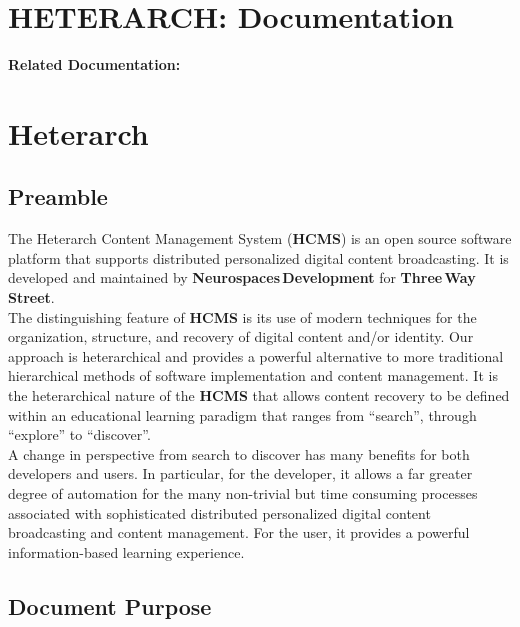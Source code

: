 \documentclass[12pt]{article}
\begin{document}
\section*{HETERARCH: Documentation}

{\bf Related Documentation:}

\section*{Heterarch}

\subsection*{Preamble}

The Heterarch Content Management System ({\bf \small HCMS}) is an open source software platform that supports distributed personalized digital content broadcasting. It is developed and maintained by {\bf Neurospaces\,Development} for {\bf Three\,Way\,Street}.\\
The distinguishing feature of {\bf \small HCMS} is its use of modern techniques for the organization, structure, and recovery of digital content and/or identity. Our approach is heterarchical and provides a powerful alternative to more traditional hierarchical methods of software implementation and content management. It is the heterarchical nature of the {\bf \small HCMS} that allows content recovery to be defined within an educational learning paradigm that ranges from ``search'', through ``explore'' to ``discover''.\\
A change in perspective from search to discover has many benefits for both developers and users. In particular, for the developer, it allows a far greater degree of automation for the many non-trivial but time consuming processes associated with sophisticated distributed personalized digital content broadcasting and content management. For the user, it provides a powerful information-based learning experience.

\subsection*{Document Purpose}
\end{document}
